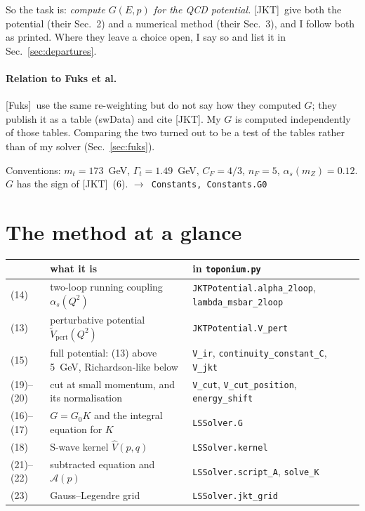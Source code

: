 \documentclass[11pt]{article}
\newcommand{\code}[1]{\texttt{#1}}
\newcommand{\Gt}{\Gamma_t}
\newcommand{\alphas}{\alpha_s}
\newcommand{\JKT}{[JKT]}
\newcommand{\Fuks}{[Fuks]}
\newcommand{\Vh}{\hat V}
\newcommand{\As}{\mathcal{A}}
\newcommand{\fn}[1]{\hfill$\to$~\code{#1}}
\begin{document}
So the task is: \emph{compute $G(E,p)$ for the QCD potential.} \JKT\ give both the potential (their Sec.~2) and a numerical
method (their Sec.~3), and I follow both as printed. Where they leave a choice open, I say so and list it in
Sec.~\ref{sec:departures}.

\paragraph{Relation to Fuks et al.}
\Fuks\ use the same re-weighting but do not say how they computed $G$; they publish it as a table (swData) and cite
\JKT. My $G$ is computed independently of those tables. Comparing the two turned out to be a test of the tables rather than
of my solver (Sec.~\ref{sec:fuks}).

Conventions: $m_t=173$~GeV, $\Gt=1.49$~GeV, $C_F=4/3$, $n_F=5$, $\alphas(m_Z)=0.12$. $G$ has the sign of \JKT\ (6).
\fn{Constants, Constants.G0}

\section{The method at a glance}

\begin{center}\small
\begin{tabularx}{\linewidth}{@{}l l L@{}}
\toprule
\JKT\ & what it is & in \code{toponium.py} \\
\midrule
(14) & two-loop running coupling $\alphas(Q^2)$ & \code{JKTPotential.alpha\_2loop}, \code{lambda\_msbar\_2loop}\\
(13) & perturbative potential $\tilde V_\mathrm{pert}(Q^2)$ & \code{JKTPotential.V\_pert}\\
(15) & full potential: (13) above 5~GeV, Richardson-like below & \code{V\_ir}, \code{continuity\_constant\_C}, \code{V\_jkt}\\
(19)--(20) & cut at small momentum, and its normalisation & \code{V\_cut}, \code{V\_cut\_position}, \code{energy\_shift}\\
(16)--(17) & $G=G_0K$ and the integral equation for $K$ & \code{LSSolver.G}\\
(18) & S-wave kernel $\Vh(p,q)$ & \code{LSSolver.kernel}\\
(21)--(22) & subtracted equation and $\As(p)$ & \code{LSSolver.script\_A}, \code{solve\_K}\\
(23) & Gauss--Legendre grid & \code{LSSolver.jkt\_grid}\\
\bottomrule
\end{tabularx}
\end{center}
\end{document}
